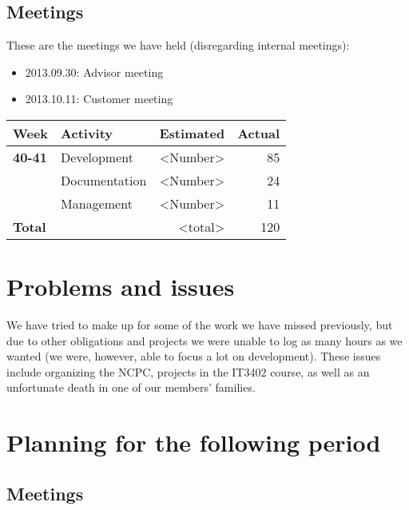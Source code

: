 \documentclass[12pt, a4paper]{article}
\begin{document}
\subsection{Meetings}
These are the meetings we have held (disregarding internal meetings):\\
\begin{itemize}
\item 2013.09.30: Advisor meeting
\item 2013.10.11: Customer meeting
\end{itemize}
  \begin{tabular}{| l | l | r | r |}
    \hline
    \textbf{Week} & \textbf{Activity} & \textbf{Estimated} & \textbf{Actual}\\ \hline
    \textbf{40-41} & Development & <Number> & 85 \\ \hline
     & Documentation & <Number> & 24 \\ \hline
     & Management & <Number> & 11 \\ \hline
     \textbf{Total }&  & <total> & 120 \\
    \hline
  \end{tabular}

\section{Problems and issues}
We have tried to make up for some of the work we have missed previously, but due to other obligations and projects we were unable to log as many hours as we wanted (we were, however, able to focus a lot on development). These issues include organizing the NCPC, projects in the IT3402 course, as well as an unfortunate death in one of our members' families.

\section{Planning for the following period}
\subsection{Meetings}
\newpage
\end{document}
